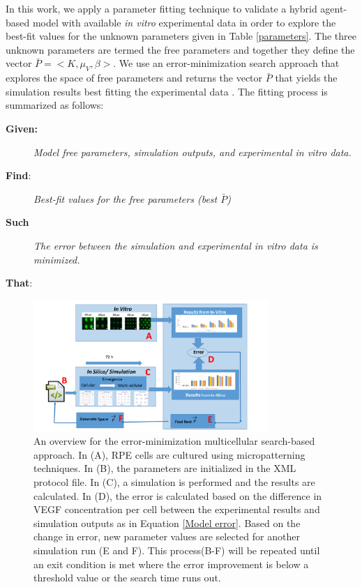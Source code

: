 In this work, we apply a parameter fitting technique to validate a hybrid agent-based model with available \textit{in vitro} experimental data in order to explore the best-fit values for the unknown parameters given in Table \ref{parameters}. The three unknown parameters are termed the free parameters and together they define the vector $\bar{P}=<K,\mu _{V},\beta>$. We use an error-minimization search approach that explores the space of free parameters and returns the vector $\bar{P}$ that yields the simulation results best fitting the experimental data \cite{qanitabaker:Vargis2014Effect}. The fitting process is summarized as follows:


\begin{description}
\item[\textbf{Given:}] \textit{   Model free parameters, simulation outputs, and experimental \textit{in vitro} data.}
\item[\textbf{Find}:] \textit{Best-fit values for the free parameters (best $\bar{P}$)}
\item[\textbf{Such}] \leavevmode  \textit{The error between the simulation and experimental \textit{in vitro} data is minimized.}
\\[-20pt] \item[\textbf{That}:]


\end{description}



\begin{figure}[!t]
\centering
\includegraphics[width=3.5in]{./figures/Overview.png}

\caption{An overview for the error-minimization multicellular search-based approach. In (A), RPE cells are cultured using micropatterning techniques. In (B), the parameters are initialized in the XML protocol file. In (C), a simulation is performed and the results are calculated. In (D), the error is calculated based on the difference in VEGF concentration per cell between the experimental results and simulation outputs as in Equation \ref{Model error}. Based on the change in error, new parameter values are selected for another simulation run (E and F). This process(B-F) will be repeated until an exit condition is met where the error improvement is below a threshold value or the search time runs out.}
\label{Fittingoverview}
\end{figure}



